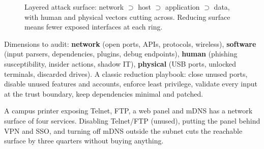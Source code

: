 \begin{figure}[h]
\centering
{}
\caption{Layered attack surface: network $\supset$ host $\supset$ application $\supset$ data, with human and physical vectors cutting across. Reducing surface means fewer exposed interfaces at each ring.}
\label{fig:surface}
\end{figure}

Dimensions to audit: \textbf{network} (open ports, APIs, protocols, wireless), \textbf{software} (input parsers, dependencies, plugins, debug endpoints), \textbf{human} (phishing susceptibility, insider actions, shadow IT), \textbf{physical} (USB ports, unlocked terminals, discarded drives). A classic reduction playbook: close unused ports, disable unused features and accounts, enforce least privilege, validate every input at the trust boundary, keep dependencies minimal and patched.

\begin{example}
A campus printer exposing Telnet, FTP, a web panel and mDNS has a network surface of four services. Disabling Telnet/FTP (unused), putting the panel behind VPN and SSO, and turning off mDNS outside the subnet cuts the reachable surface by three quarters without buying anything.
\end{example}

